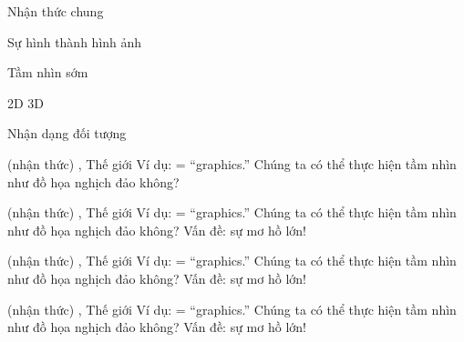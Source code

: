 \documentclass{article}
\begin{document}
\begin{huge}

\sf


\blob Nhận thức chung

\blob Sự hình thành hình ảnh

\blob Tầm nhìn sớm

\blob 2D \mat{$\rightarrow$} 3D

\blob Nhận dạng đối tượng





 (nhận thức) , Thế giới 
\mat{\[
  S = g(W)
\]}%
Ví dụ:  = ``graphics.'' Chúng ta có thể thực hiện tầm nhìn như đồ họa nghịch đảo không?
\mat{\[
  W = g^{-1}(S)
\]}%


 (nhận thức) , Thế giới 
\mat{\[
  S = g(W)
\]}%
Ví dụ:  = ``graphics.'' Chúng ta có thể thực hiện tầm nhìn như đồ họa nghịch đảo không?
\mat{\[
  W = g^{-1}(S)
\]}%
Vấn đề: sự mơ hồ lớn!

\vspace*{0.2in}

\textwidth
{}


 (nhận thức) , Thế giới 
\mat{\[
  S = g(W)
\]}%
Ví dụ:  = ``graphics.'' Chúng ta có thể thực hiện tầm nhìn như đồ họa nghịch đảo không?
\mat{\[
  W = g^{-1}(S)
\]}%
Vấn đề: sự mơ hồ lớn!

\vspace*{0.2in}

\textwidth
{}


 (nhận thức) , Thế giới 
\mat{\[
  S = g(W)
\]}%
Ví dụ:  = ``graphics.'' Chúng ta có thể thực hiện tầm nhìn như đồ họa nghịch đảo không?
\mat{\[
  W = g^{-1}(S)
\]}%
Vấn đề: sự mơ hồ lớn!


\end{huge}
\end{document}

